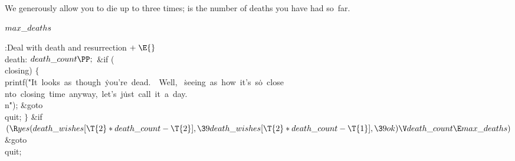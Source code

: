 We generously allow you to die up to three times;  is the
number of deaths you have had so~far.

\Y\B\4\D$\\{max\_deaths}$ \5
\par
\Y\B\4:Deal with death and resurrection\X${}\mathrel+\E{}$\6
\4\\{death}:\5
${}\\{death\_count}\PP;{}$\6
\&{if} (\\{closing})\5
${}\{{}$\1\6
\\{printf}(\.{"It\ looks\ as\ though\ }\)\.{you're\ dead.\ \ Well,\ }\)%
\.{seeing\ as\ how\ it's\ s}\)\.{o\ close\\nto\ closing\ }\)\.{time\ anyway,\
let's\ j}\)\.{ust\ call\ it\ a\ day.\\n}\)\.{"});\6
\&{goto} \\{quit};\6
\4${}\}{}$\2\6
\&{if} ${}(\R\\{yes}(\\{death\_wishes}[\T{2}*\\{death\_count}-\T{2}],\39%
\\{death\_wishes}[\T{2}*\\{death\_count}-\T{1}],\39\\{ok})\V\\{death\_count}\E%
\\{max\_deaths}){}$\1\5
\&{goto} \\{quit};\2\par
\fi

